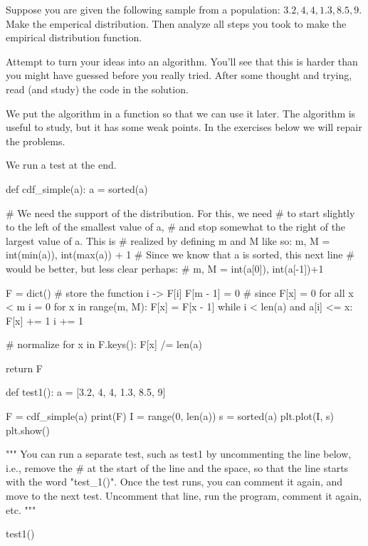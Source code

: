 \begin{exercise}
  Suppose you are given the following sample from a population: $3.2, 4, 4, 1.3, 8.5, 9$.
  Make the emperical distribution.
  Then analyze all steps you took to make the empirical distribution function.

  Attempt to turn your ideas into an algorithm.
  You'll see that this is harder than you might have guessed before you really tried.
  After some thought and trying, read (and study) the code in the solution.

\begin{solution}
We put the algorithm in a function so that we can use it later.  The algorithm is useful to study,  but it has some weak points. In the exercises below we will repair the problems.

We run a test at the end.

\begin{pyverbatim}
def cdf_simple(a):
    a = sorted(a)

    # We need the support of the distribution. For this, we need
    # to start slightly to the left of the smallest value of a,
    # and stop somewhat to the right of the largest value of a. This is
    # realized by defining m and M like so:
    m, M = int(min(a)), int(max(a)) + 1
    # Since we know that a is sorted, this next line
    # would be better, but less clear perhaps:
    # m, M = int(a[0]), int(a[-1])+1

    F = dict()  # store the function i -> F[i]
    F[m - 1] = 0  # since F[x] = 0 for all x < m
    i = 0
    for x in range(m, M):
        F[x] = F[x - 1]
        while i < len(a) and a[i] <= x:
            F[x] += 1
            i += 1

    # normalize
    for x in F.keys():
        F[x] /= len(a)

    return F

def test1():
    a = [3.2, 4, 4, 1.3, 8.5, 9]

    F = cdf_simple(a)
    print(F)
    I = range(0, len(a))
    s = sorted(a)
    plt.plot(I, s)
    plt.show()

"""
You can run a separate test, such as test1 by uncommenting the line
below, i.e., remove the # at the start of the line and the space, so
that the line starts with the word "test_1()". Once the test runs, you
can comment it again, and move to the next test. Uncomment that line,
run the program, comment it again, etc.
"""

test1()
\end{pyverbatim}

\end{solution}
\end{exercise}

